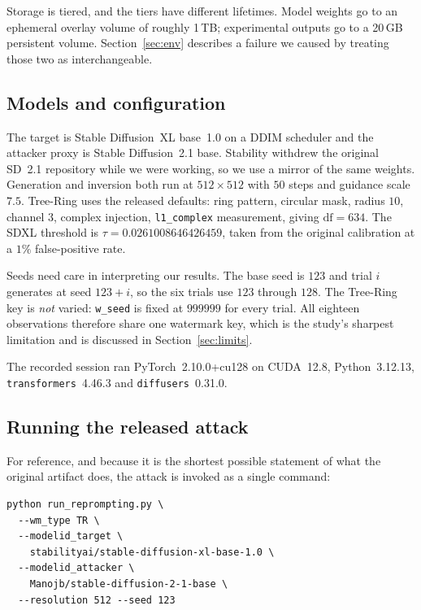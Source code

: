 \documentclass[10pt,twocolumn]{article}
\newcommand{\code}[1]{\texttt{\small #1}}
\begin{document}
Storage is tiered, and the tiers have different lifetimes. Model weights go to an
ephemeral overlay volume of roughly 1\,TB; experimental outputs go to a 20\,GB
persistent volume. Section~\ref{sec:env} describes a failure we caused by treating
those two as interchangeable.

\subsection{Models and configuration}

The target is Stable Diffusion~XL base~1.0 on a DDIM scheduler and the attacker proxy
is Stable Diffusion~2.1 base. Stability withdrew the original SD~2.1 repository while
we were working, so we use a mirror of the same weights. Generation and inversion both
run at $512 \times 512$ with $50$ steps and guidance scale $7.5$. Tree-Ring uses the
released defaults: ring pattern, circular mask, radius $10$, channel $3$, complex
injection, \code{l1\_complex} measurement, giving $\mathrm{df} = 634$. The SDXL
threshold is $\tau = 0.0261008646426459$, taken from the original calibration at a
$1\%$ false-positive rate.

Seeds need care in interpreting our results. The base seed is $123$ and trial $i$
generates at seed $123 + i$, so the six trials use $123$ through $128$. The Tree-Ring
key is \emph{not} varied: \code{w\_seed} is fixed at $999999$ for every trial. All
eighteen observations therefore share one watermark key, which is the study's
sharpest limitation and is discussed in Section~\ref{sec:limits}.

The recorded session ran PyTorch~2.10.0+cu128 on CUDA~12.8, Python~3.12.13,
\code{transformers}~4.46.3 and \code{diffusers}~0.31.0.

\subsection{Running the released attack}

For reference, and because it is the shortest possible statement of what the original
artifact does, the attack is invoked as a single command:

\begin{lstlisting}[style=sh,caption={The released Reprompt entry point, exactly
as our notebook invokes it. Everything else in this paper is reproduction and
instrumentation work built around this one command.},label=lst:cli]
python run_reprompting.py \
  --wm_type TR \
  --modelid_target \
    stabilityai/stable-diffusion-xl-base-1.0 \
  --modelid_attacker \
    Manojb/stable-diffusion-2-1-base \
  --resolution 512 --seed 123
\end{lstlisting}
\end{document}
